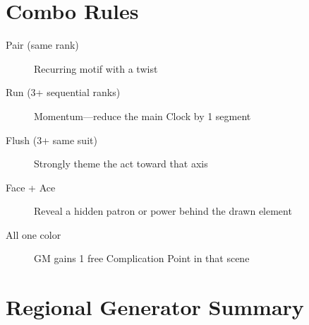 \section{Combo Rules}

\begin{description}
\item[Pair (same rank)] Recurring motif with a twist
\item[Run (3+ sequential ranks)] Momentum---reduce the main Clock by 1 segment
\item[Flush (3+ same suit)] Strongly theme the act toward that axis
\item[Face + Ace] Reveal a hidden patron or power behind the drawn element
\item[All one color] GM gains 1 free Complication Point in that scene
\end{description}

\section{Regional Generator Summary}

